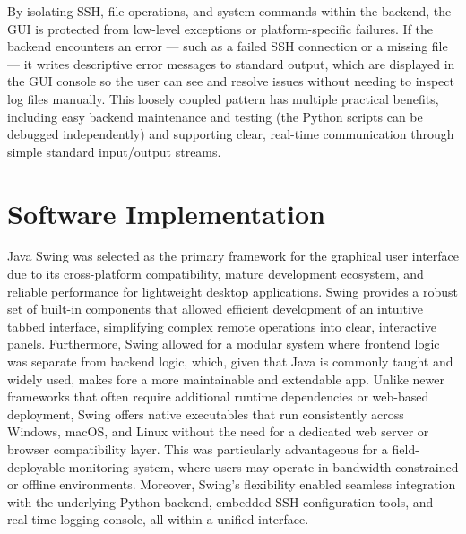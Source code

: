 \documentclass{article}
\begin{document}
By isolating SSH, file operations, and system commands within the backend, the GUI is protected from low-level exceptions or platform-specific failures. If the backend encounters an error — such as a failed SSH connection or a missing file — it writes descriptive error messages to standard output, which are displayed in the GUI console so the user can see and resolve issues without needing to inspect log files manually. This loosely coupled pattern has multiple practical benefits, including easy backend maintenance and testing (the Python scripts can be debugged independently) and supporting clear, real-time communication through simple standard input/output streams.

\section{Software Implementation}
Java Swing was selected as the primary framework for the graphical user interface due to its cross-platform compatibility, mature development ecosystem, and reliable performance for lightweight desktop applications. Swing provides a robust set of built-in components that allowed efficient development of an intuitive tabbed interface, simplifying complex remote operations into clear, interactive panels. Furthermore, Swing allowed for a modular system where frontend logic was separate from backend logic, which, given that Java is commonly taught and widely used, makes fore a more maintainable and extendable app. Unlike newer frameworks that often require additional runtime dependencies or web-based deployment, Swing offers native executables that run consistently across Windows, macOS, and Linux without the need for a dedicated web server or browser compatibility layer. This was particularly advantageous for a field-deployable monitoring system, where users may operate in bandwidth-constrained or offline environments. Moreover, Swing’s flexibility enabled seamless integration with the underlying Python backend, embedded SSH configuration tools, and real-time logging console, all within a unified interface.
\end{document}
